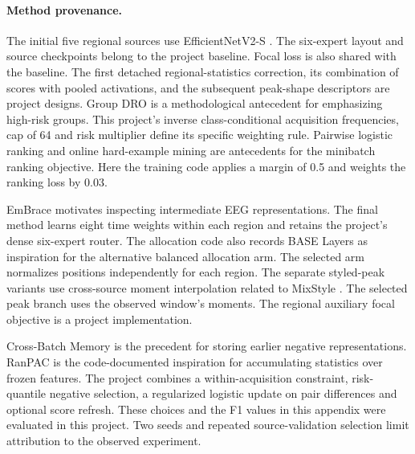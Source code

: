 \paragraph{Method provenance.}
The initial five regional sources use EfficientNetV2-S \citep{tan2021}. The six-expert layout and source checkpoints belong to the project baseline. Focal loss \citep{lin2017} is also shared with the baseline. The first detached regional-statistics correction, its combination of scores with pooled activations, and the subsequent peak-shape descriptors are project designs. Group DRO \citep{sagawa2020} is a methodological antecedent for emphasizing high-risk groups. This project's inverse class-conditional acquisition frequencies, cap of 64 and risk multiplier define its specific weighting rule. Pairwise logistic ranking \citep{burges2005} and online hard-example mining \citep{shrivastava2016} are antecedents for the minibatch ranking objective. Here the training code applies a margin of 0.5 and weights the ranking loss by 0.03.

EmBrace \citep{jia2026} motivates inspecting intermediate EEG representations. The final method learns eight time weights within each region and retains the project's dense six-expert router. The allocation code also records BASE Layers \citep{lewis2021} as inspiration for the alternative balanced allocation arm. The selected arm normalizes positions independently for each region. The separate styled-peak variants use cross-source moment interpolation related to MixStyle \citep{zhou2021mixstyle}. The selected peak branch uses the observed window's moments. The regional auxiliary focal objective is a project implementation.

Cross-Batch Memory \citep{wang2020} is the precedent for storing earlier negative representations. RanPAC \citep{mcdonnell2023} is the code-documented inspiration for accumulating statistics over frozen features. The project combines a within-acquisition constraint, risk-quantile negative selection, a regularized logistic update on pair differences and optional score refresh. These choices and the F1 values in this appendix were evaluated in this project. Two seeds and repeated source-validation selection limit attribution to the observed experiment.
